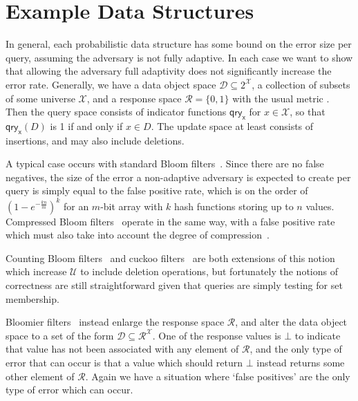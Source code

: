 \documentclass[11pt, pdftex]{article}
\begin{document}
\section{Example Data Structures}

In general, each probabilistic data structure has some bound on the error size per query, assuming the adversary is not fully adaptive. In each case we want to show that allowing the adversary full adaptivity does not significantly increase the error rate. Generally, we have a data object space $\mathcal{D} \subseteq 2^\mathcal{X}$, a collection of subsets of some universe $\mathcal{X}$, and a response space $\mathcal{R} = \{0,1\}$ with the usual metric . Then the query space consists of indicator functions $\mathsf{qry_x}$ for $x \in \mathcal{X}$, so that $\mathsf{qry_x}(D)$ is 1 if and only if $x \in D$. The update space at least consists of insertions, and may also include deletions.

A typical case occurs with standard Bloom filters~\cite{xxx}. Since there are no false negatives, the size of the error a non-adaptive adversary is expected to create per query is simply equal to the false positive rate, which is on the order of $(1-e^{-\frac{kn}{m}})^k$ for an $m$-bit array with $k$ hash functions storing up to $n$ values. Compressed Bloom filters~\cite{xxx} operate in the same way, with a false positive rate which must also take into account the degree of compression~. 

Counting Bloom filters~\cite{xxx} and cuckoo filters~\cite{xxx} are both extensions of this notion which increase $\mathcal{U}$ to include deletion operations, but fortunately the notions of correctness are still straightforward given that queries are simply testing for set membership.   

Bloomier filters~\cite{xxx} instead enlarge the response space $\mathcal{R}$, and alter the data object space to a set of the form $\mathcal{D} \subseteq \mathcal{R}^\mathcal{X}$.  One of the response values is $\bot$ to indicate that value has not been associated with any element of $\mathcal{R}$, and the only type of error that can occur is that a value which should return $\bot$ instead returns some other element of $\mathcal{R}$. Again we have a situation where `false positives' are the only type of error which can occur.
\end{document}

